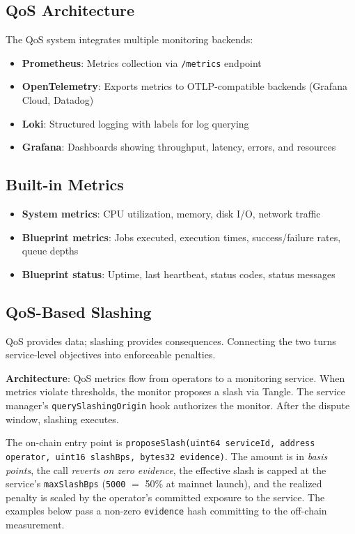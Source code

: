 \documentclass[11pt,a4paper]{article}
\begin{document}
\subsection{QoS Architecture}

The QoS system integrates multiple monitoring backends:

\begin{itemize}
    \item \textbf{Prometheus}: Metrics collection via \texttt{/metrics} endpoint
    \item \textbf{OpenTelemetry}: Exports metrics to OTLP-compatible backends (Grafana Cloud, Datadog)
    \item \textbf{Loki}: Structured logging with labels for log querying
    \item \textbf{Grafana}: Dashboards showing throughput, latency, errors, and resources
\end{itemize}

\subsection{Built-in Metrics}

\begin{itemize}
    \item \textbf{System metrics}: CPU utilization, memory, disk I/O, network traffic
    \item \textbf{Blueprint metrics}: Jobs executed, execution times, success/failure rates, queue depths
    \item \textbf{Blueprint status}: Uptime, last heartbeat, status codes, status messages
\end{itemize}

\subsection{QoS-Based Slashing}

QoS provides data; slashing provides consequences. Connecting the two turns service-level objectives into enforceable penalties.

\textbf{Architecture}: QoS metrics flow from operators to a monitoring service. When metrics violate thresholds, the monitor proposes a slash via Tangle. The service manager's \texttt{querySlashingOrigin} hook authorizes the monitor. After the dispute window, slashing executes.

The on-chain entry point is \texttt{proposeSlash(uint64 serviceId, address operator, uint16 slashBps, bytes32 evidence)}. The amount is in \emph{basis points}, the call \emph{reverts on zero evidence}, the effective slash is capped at the service's \texttt{maxSlashBps} (\texttt{5000} $=$ 50\% at mainnet launch), and the realized penalty is scaled by the operator's committed exposure to the service. The examples below pass a non-zero \texttt{evidence} hash committing to the off-chain measurement.
\end{document}
